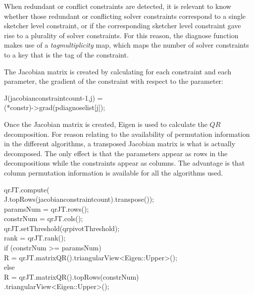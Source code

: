 \documentclass[12pt,twoside,a4paper]{book}
\begin{document}
    When redundant or conflict constraints are detected, it is relevant to know whether those redundant or conflicting solver constraints correspond to a single sketcher level constraint, or if the corresponding sketcher level constraint gave rise to a plurality of solver constraints. For this reason, the diagnose function makes use of a \emph{tagmultiplicity} map, which maps the number of solver constraints to a key that is the tag of the constraint.

    The Jacobian matrix is created by calculating for each constraint and each parameter, the gradient of the constraint with respect to the parameter:

    \begin{codequote}
    J(jacobianconstraintcount-1,j) = \\
    \-\hspace{4.5cm}(*constr)-\textgreater{}grad(pdiagnoselist[j]);
    \end{codequote}

    Once the Jacobian matrix is created, Eigen is used to calculate the $QR$ decomposition. For reason relating to the availability of permutation information in the different algorithms, a transposed Jacobian matrix is what is actually decomposed. The only effect is that the parameters appear as rows in the decompositions while the constraints appear as columns. The advantage is that column permutation information is available for all the algorithms used.

    \begin{codequote}
    qrJT.compute(\\
    \-\hspace{2cm}J.topRows(jacobianconstraintcount).transpose());\\

    paramsNum = qrJT.rows();\\
    constrNum = qrJT.cols();\\

    qrJT.setThreshold(qrpivotThreshold);\\
    rank = qrJT.rank();\\

    if (constrNum \textgreater{}= paramsNum)\\
    \-\hspace{0.5cm}R = qrJT.matrixQR().triangularView\textless{}Eigen::Upper\textgreater{}();\\
    else\\
    \-\hspace{0.5cm}R = qrJT.matrixQR().topRows(constrNum)\\
    \-\hspace{2cm}.triangularView\textless{}Eigen::Upper\textgreater{}();\\
    \end{codequote}
\end{document}
